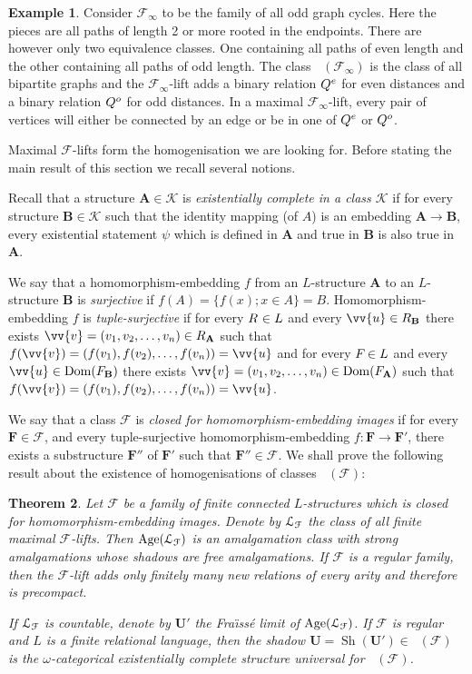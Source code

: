 \documentclass{elsarticle}
\def\Lifts{{\cal L}}
\def\Forb{\mathop{\mathrm{Forb_{he}}}\nolimits}
\def\dom{\mathop{\mathrm{Dom}}\nolimits}
\def\Age{\mathop{\mathrm{Age}}\nolimits}
\def\sh{\mathop{\mathrm{Sh}}\nolimits}
\def\str#1{\mathbf {#1}}
\def\nbrel#1#2{R\ifstrempty{#1}{}{_{#1}}\ifstrempty{#2}{}{^{#2}}}
\def\rel#1#2{\nbrel{\ifstrempty{#1}{}{\str{#1}}}{#2}}
\def\func#1#2{\nbfunc{\ifstrempty{#1}{}{\str{#1}}}{#2}}
\def\nbfunc#1#2{F\ifstrempty{#1}{}{_{#1}}\ifstrempty{#2}{}{^{#2}}}
\def\extl#1#2{Q\ifstrempty{#1}{}{_{#1}}\ifstrempty{#2}{}{^{#2}}}
\def\ext#1#2{\extl{\ifstrempty{#1}{}{\str{#1}}}{#2}}
\def\F{{\mathcal F}}
\def\K{{\mathcal K}}
\def\Fraisse{Fra\"{\i}ss\' e}
\theoremstyle{plain}
\newtheorem{theorem}{Theorem}[section]
\theoremstyle{definition}
\newtheorem{example}[theorem]{Example}
\theoremstyle{remark}
\begin{document}
\begin{example}
Consider $\mathcal F_\infty$ to be the family of all odd graph cycles.  Here
the pieces are all paths of length 2 or more rooted in the endpoints.  There
are however only two equivalence classes. One containing all paths of even
length and the other containing all paths of odd length.  The class
$\Forb(\F_\infty)$ is the class of all bipartite graphs and the $\F_\infty$-lift
adds a binary relation $\ext{}{e}$ for even distances and a binary relation $\ext{}{o}$ for
odd distances. In a maximal $\F_\infty$-lift, every pair of vertices will either
be connected by an edge or be in one of $\ext{}{e}$ or $\ext{}{o}$.
\end{example}
Maximal $\F$-lifts form the homogenisation we are looking for. Before stating the main result of this section we recall several notions.

Recall that a structure $\str{A}\in\K$ is \emph{existentially complete in a class $\K$} if
for every structure $\str{B} \in \K$ such that the identity mapping (of $A$)
is an embedding $\str{A}\to\str{B}$, every existential statement $\psi$
which is defined in $\str{A}$ and true in $\str{B}$ is also true in
$\str{A}$.

We say that a homomorphism-embedding $f$ from an $L$-structure $\str{A}$ to an $L$-structure $\str{B}$ is \emph{surjective} if $f(A)=\{f(x); x \in A\}=B$. Homomorphism-embedding $f$ is \emph{tuple-surjective}
if for every $\rel{}{}\in L$ and every $\vv{u}\in \rel{B}{}$ there exists $\vv{v}=(v_1,v_2,\ldots, v_n)\in \rel{A}{}$ such
that $f(\vv{v})=(f(v_1),f(v_2),\ldots, f(v_n))=\vv{u}$ and for every $\func{}{}\in L$ and every $\vv{u}\in \dom(\func{B}{})$ there exists $\vv{v}=(v_1,v_2,\ldots, v_n)\in \dom(\func{A}{})$ such that $f(\vv{v})=(f(v_1),f(v_2),\ldots, f(v_n))=\vv{u}$.

We say that a class $\F$ is \emph{closed for homomorphism-embedding images} if
for every $\str{F}\in \F$, and every tuple-surjective homomorphism-embedding
$f\colon \str{F}\to \str{F}'$, there exists a substructure $\str{F}''$ of $\str{F}'$ such that  $\str{F}''\in \F$.
We shall prove the following result about the existence of homogenisations of classes $\Forb(\F)$:

\begin{theorem}
\label{mainthm}
Let $\F$ be a family of finite connected $L$-structures which is
closed for homomorphism-embedding images.  Denote by $\Lifts_\mathcal F$ the
class of all finite maximal $\F$-lifts.  Then $\Age(\Lifts_\mathcal F)$ is an amalgamation class
with strong amalgamations whose shadows are free amalgamations.
If $\F$ is a regular family, then the $\F$-lift adds only finitely many new relations
of every arity and therefore is precompact.

If $\Lifts_\mathcal F$ is countable, denote by $\str{U}'$ the \Fraisse{} limit of $\Age(\Lifts_\mathcal F)$.
If $\F$ is regular and $L$ is a finite relational language, then the shadow
$\str{U}=\sh(\str{U}')\in\Forb(\F)$ is the $\omega$-categorical existentially complete
structure universal for $\Forb(\F)$.
\end{theorem}
\end{document}
